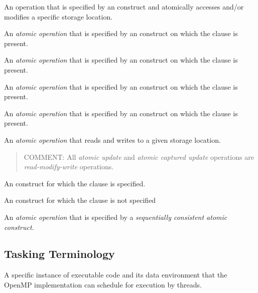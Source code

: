\glossarydefstart
An operation that is specified by an  construct and atomically
accesses and/or modifies a specific storage location.
\glossarydefend

\glossarydefstart
An \emph{atomic operation} that is specified by an  construct 
on which the  clause is present.
\glossarydefend

\glossarydefstart
An \emph{atomic operation} that is specified by an  construct 
on which the  clause is present.
\glossarydefend

\glossarydefstart
An \emph{atomic operation} that is specified by an  construct 
on which the  clause is present.
\glossarydefend

\glossarydefstart
An \emph{atomic operation} that is specified by an  construct 
on which the  clause is present.
\glossarydefend

\glossarydefstart
An \emph{atomic operation} that reads and writes to a given storage location.

\begin{quote}
COMMENT: All \emph{atomic update} and \emph{atomic captured update} operations
are \emph{read-modify-write} operations.
\end{quote}
\glossarydefend

\glossarydefstart
An  construct for which the  clause is specified.
\glossarydefend
\bigskip

\glossarydefstart
An  construct for which the  clause is not specified
\glossarydefend
\bigskip
\bigskip

\glossarydefstart
An \emph{atomic operation} that is specified by a 
\emph{sequentially consistent atomic construct}. 
\glossarydefend
\bigskip
\bigskip


% 
\subsection{Tasking Terminology}
\label{subsec:Tasking Terminology}
\glossarydefstart
A specific instance of executable code and its data environment that the
OpenMP implementation can schedule for execution by threads.
\glossarydefend

